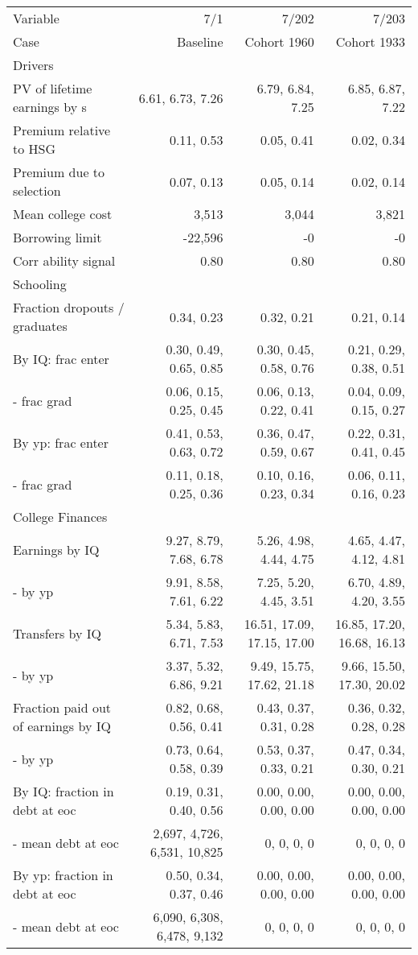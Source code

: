 \begin{tabular}{lrrr}
\hline
Variable & 7/1  & 7/202  & 7/203  \\ 
Case & Baseline  & Cohort 1960  & Cohort 1933  \\ 
Drivers &   &   &   \\ 
PV of lifetime earnings by s & 6.61, 6.73, 7.26  & 6.79, 6.84, 7.25  & 6.85, 6.87, 7.22  \\ 
Premium relative to HSG & 0.11, 0.53  & 0.05, 0.41  & 0.02, 0.34  \\ 
Premium due to selection & 0.07, 0.13  & 0.05, 0.14  & 0.02, 0.14  \\ 
Mean college cost & 3,513  & 3,044  & 3,821  \\ 
Borrowing limit & -22,596  & -0  & -0  \\ 
Corr ability signal & 0.80  & 0.80  & 0.80  \\ 
\hline
Schooling &   &   &   \\ 
Fraction dropouts / graduates & 0.34, 0.23  & 0.32, 0.21  & 0.21, 0.14  \\ 
By IQ: frac enter & 0.30, 0.49, 0.65, 0.85  & 0.30, 0.45, 0.58, 0.76  & 0.21, 0.29, 0.38, 0.51  \\ 
- frac grad & 0.06, 0.15, 0.25, 0.45  & 0.06, 0.13, 0.22, 0.41  & 0.04, 0.09, 0.15, 0.27  \\ 
By yp: frac enter & 0.41, 0.53, 0.63, 0.72  & 0.36, 0.47, 0.59, 0.67  & 0.22, 0.31, 0.41, 0.45  \\ 
- frac grad & 0.11, 0.18, 0.25, 0.36  & 0.10, 0.16, 0.23, 0.34  & 0.06, 0.11, 0.16, 0.23  \\ 
\hline
College Finances &   &   &   \\ 
Earnings by IQ & 9.27, 8.79, 7.68, 6.78  & 5.26, 4.98, 4.44, 4.75  & 4.65, 4.47, 4.12, 4.81  \\ 
- by yp & 9.91, 8.58, 7.61, 6.22  & 7.25, 5.20, 4.45, 3.51  & 6.70, 4.89, 4.20, 3.55  \\ 
Transfers by IQ & 5.34, 5.83, 6.71, 7.53  & 16.51, 17.09, 17.15, 17.00  & 16.85, 17.20, 16.68, 16.13  \\ 
- by yp & 3.37, 5.32, 6.86, 9.21  & 9.49, 15.75, 17.62, 21.18  & 9.66, 15.50, 17.30, 20.02  \\ 
Fraction paid out of earnings by IQ & 0.82, 0.68, 0.56, 0.41  & 0.43, 0.37, 0.31, 0.28  & 0.36, 0.32, 0.28, 0.28  \\ 
- by yp & 0.73, 0.64, 0.58, 0.39  & 0.53, 0.37, 0.33, 0.21  & 0.47, 0.34, 0.30, 0.21  \\ 
By IQ: fraction in debt at eoc & 0.19, 0.31, 0.40, 0.56  & 0.00, 0.00, 0.00, 0.00  & 0.00, 0.00, 0.00, 0.00  \\ 
- mean debt at eoc & 2,697, 4,726, 6,531, 10,825  & 0, 0, 0, 0  & 0, 0, 0, 0  \\ 
By yp: fraction in debt at eoc & 0.50, 0.34, 0.37, 0.46  & 0.00, 0.00, 0.00, 0.00  & 0.00, 0.00, 0.00, 0.00  \\ 
- mean debt at eoc & 6,090, 6,308, 6,478, 9,132  & 0, 0, 0, 0  & 0, 0, 0, 0  \\ 
\hline
\end{tabular}%
